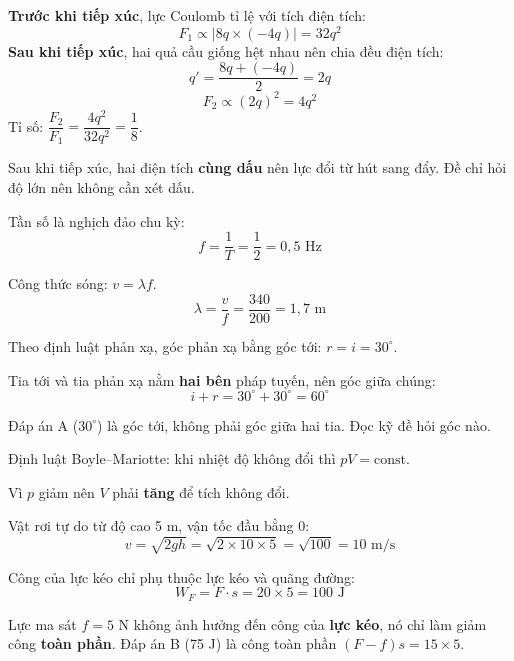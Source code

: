 \documentclass[11pt, a4paper]{article}
\begin{document}
\begin{dapan}[14 — Đáp án D]
\textbf{Trước khi tiếp xúc}, lực Coulomb tỉ lệ với tích điện tích:
\[
F_1 \propto |8q \times (-4q)| = 32q^2
\]
\textbf{Sau khi tiếp xúc}, hai quả cầu giống hệt nhau nên chia đều điện tích:
\[
q' = \frac{8q + (-4q)}{2} = 2q
\]
\[
F_2 \propto (2q)^2 = 4q^2
\]
Tỉ số: $\dfrac{F_2}{F_1} = \dfrac{4q^2}{32q^2} = \dfrac{1}{8}$.

 Sau khi tiếp xúc, hai điện tích \textbf{cùng dấu} nên lực đổi từ hút sang đẩy. Đề chỉ hỏi độ lớn nên không cần xét dấu.
\end{dapan}


\begin{dapan}[15 — Đáp án B]
Tần số là nghịch đảo chu kỳ:
\[
f = \frac{1}{T} = \frac{1}{2} = 0{,}5 \text{ Hz}
\]
\end{dapan}

\begin{dapan}[16 — Đáp án A]
Công thức sóng: $v = \lambda f$.
\[
\lambda = \frac{v}{f} = \frac{340}{200} = 1{,}7 \text{ m}
\]
\end{dapan}

\begin{dapan}[17 — Đáp án C]
Theo định luật phản xạ, góc phản xạ bằng góc tới: $r = i = 30^\circ$.

Tia tới và tia phản xạ nằm \textbf{hai bên} pháp tuyến, nên góc giữa chúng:
\[
i + r = 30^\circ + 30^\circ = 60^\circ
\]

 Đáp án A ($30^\circ$) là góc tới, không phải góc giữa hai tia. Đọc kỹ đề hỏi góc nào.
\end{dapan}

\begin{dapan}[18 — Đáp án D]
Định luật Boyle--Mariotte: khi nhiệt độ không đổi thì $pV = \text{const}$.

Vì $p$ giảm nên $V$ phải \textbf{tăng} để tích không đổi.
\end{dapan}

\begin{dapan}[19 — Đáp án C]
Vật rơi tự do từ độ cao 5 m, vận tốc đầu bằng 0:
\[
v = \sqrt{2gh} = \sqrt{2 \times 10 \times 5} = \sqrt{100} = 10 \text{ m/s}
\]
\end{dapan}

\begin{dapan}[20 — Đáp án A]
Công của lực kéo chỉ phụ thuộc lực kéo và quãng đường:
\[
W_F = F \cdot s = 20 \times 5 = 100 \text{ J}
\]

 Lực ma sát $f = 5$ N không ảnh hưởng đến công của \textbf{lực kéo}, nó chỉ làm giảm công \textbf{toàn phần}. Đáp án B (75 J) là công toàn phần $(F-f)s = 15\times5$.
\end{dapan}
\end{document}
